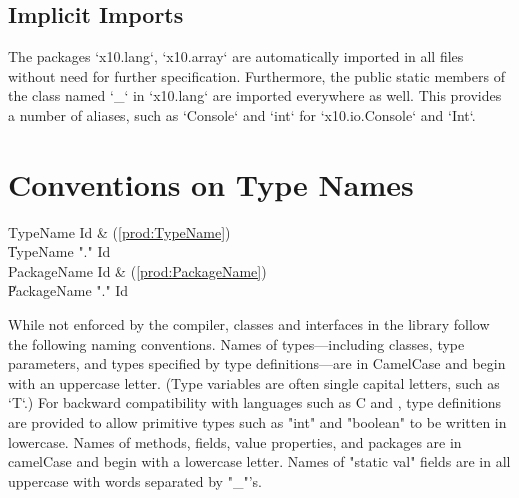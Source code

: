 \subsection{Implicit Imports}

The packages \xcd`x10.lang`, \xcd`x10.array` are automatically imported in all
files without need for further specification.
Furthermore, the public static members of the class named \xcd`_` in
\xcd`x10.lang` are imported everywhere as well. This provides a number of
aliases, such as \xcd`Console` and \xcd`int` for \xcd`x10.io.Console` and
\xcd`Int`. 




\section{Conventions on Type Names}

\begin{bbgrammar}
            TypeName \: Id & (\ref{prod:TypeName}) \\
                     \| TypeName \xcd"." Id \\
         PackageName \: Id & (\ref{prod:PackageName}) \\
                     \| PackageName \xcd"." Id \\
\end{bbgrammar}


While not enforced by the compiler, classes and interfaces
in the \Xten{} library follow the following naming conventions.
Names of types---including classes,
type parameters, and types specified by type definitions---are in
CamelCase and begin with an uppercase letter.  (Type variables are often
single capital letters, such as \xcd`T`.)
For backward
compatibility with languages such as C and \java{}, type
definitions are provided to allow primitive types
such as \xcd"int" and \xcd"boolean" to be written in lowercase.
Names of methods, fields, value properties, and packages are in camelCase and
begin with a lowercase letter. 
Names of \xcd"static val" fields are in all uppercase with words
separated by \xcd"_"'s.
